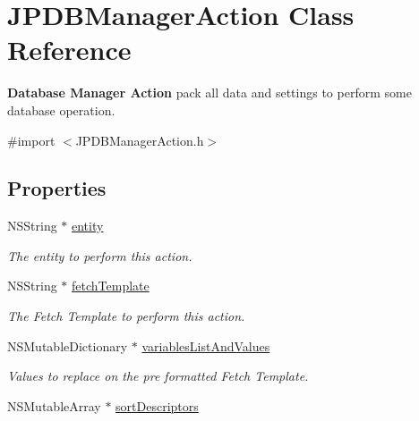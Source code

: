 \hypertarget{interface_j_p_d_b_manager_action}{
\section{JPDBManagerAction Class Reference}
\label{interface_j_p_d_b_manager_action}
}


{\bfseries Database Manager Action} pack all data and settings to perform some database operation.  




{\ttfamily \#import $<$JPDBManagerAction.h$>$}

\subsection*{Properties}
\begin{DoxyCompactItemize}
\item 
\hypertarget{interface_j_p_d_b_manager_action_a705cfdcdfd4ff48deff4ba42928412b9}{
NSString $\ast$ \hyperlink{interface_j_p_d_b_manager_action_a705cfdcdfd4ff48deff4ba42928412b9}{entity}}
\label{interface_j_p_d_b_manager_action_a705cfdcdfd4ff48deff4ba42928412b9}

\begin{DoxyCompactList}\small\item\em The entity to perform this action. \item\end{DoxyCompactList}\item 
\hypertarget{interface_j_p_d_b_manager_action_af2476369c483c826653f8b7d1721c452}{
NSString $\ast$ \hyperlink{interface_j_p_d_b_manager_action_af2476369c483c826653f8b7d1721c452}{fetchTemplate}}
\label{interface_j_p_d_b_manager_action_af2476369c483c826653f8b7d1721c452}

\begin{DoxyCompactList}\small\item\em The Fetch Template to perform this action. \item\end{DoxyCompactList}\item 
\hypertarget{interface_j_p_d_b_manager_action_a8832555fcf8837ece9ded4a9ba408fd4}{
NSMutableDictionary $\ast$ \hyperlink{interface_j_p_d_b_manager_action_a8832555fcf8837ece9ded4a9ba408fd4}{variablesListAndValues}}
\label{interface_j_p_d_b_manager_action_a8832555fcf8837ece9ded4a9ba408fd4}

\begin{DoxyCompactList}\small\item\em Values to replace on the pre formatted Fetch Template. \item\end{DoxyCompactList}\item 
\hypertarget{interface_j_p_d_b_manager_action_a354db0f8d4e9039eb7e4095526786ade}{
NSMutableArray $\ast$ \hyperlink{interface_j_p_d_b_manager_action_a354db0f8d4e9039eb7e4095526786ade}{sortDescriptors}}
\label{interface_j_p_d_b_manager_action_a354db0f8d4e9039eb7e4095526786ade}


\end{DoxyCompactItemize}
